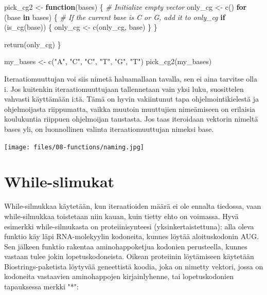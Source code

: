 \documentclass[
]{book}
\newenvironment{Shaded}{\begin{snugshade}}{\end{snugshade}}
\newcommand{\CommentTok}[1]{\textcolor[rgb]{0.56,0.35,0.01}{\textit{#1}}}
\newcommand{\ControlFlowTok}[1]{\textcolor[rgb]{0.13,0.29,0.53}{\textbf{#1}}}
\newcommand{\FunctionTok}[1]{\textcolor[rgb]{0.00,0.00,0.00}{#1}}
\newcommand{\NormalTok}[1]{#1}
\newcommand{\OtherTok}[1]{\textcolor[rgb]{0.56,0.35,0.01}{#1}}
\newcommand{\StringTok}[1]{\textcolor[rgb]{0.31,0.60,0.02}{#1}}
\begin{document}
\begin{Shaded}
\begin{Highlighting}[]
\NormalTok{pick\_cg2 }\OtherTok{\textless{}{-}} \ControlFlowTok{function}\NormalTok{(bases) \{}
  \CommentTok{\# Initialize empty vector}
\NormalTok{  only\_cg }\OtherTok{\textless{}{-}} \FunctionTok{c}\NormalTok{()}
  \ControlFlowTok{for}\NormalTok{ (base }\ControlFlowTok{in}\NormalTok{ bases) \{}
    \CommentTok{\# If the current base is C or G, add it to only\_cg}
    \ControlFlowTok{if}\NormalTok{ (}\FunctionTok{is\_cg}\NormalTok{(base)) \{}
\NormalTok{      only\_cg }\OtherTok{\textless{}{-}} \FunctionTok{c}\NormalTok{(only\_cg, base)}
\NormalTok{    \}}
\NormalTok{  \}}
  
  \FunctionTok{return}\NormalTok{(only\_cg)}
\NormalTok{\}}

\NormalTok{my\_bases }\OtherTok{\textless{}{-}} \FunctionTok{c}\NormalTok{(}\StringTok{"A"}\NormalTok{, }\StringTok{"C"}\NormalTok{, }\StringTok{"C"}\NormalTok{, }\StringTok{"T"}\NormalTok{, }\StringTok{"G"}\NormalTok{, }\StringTok{"T"}\NormalTok{)}
\FunctionTok{pick\_cg2}\NormalTok{(my\_bases)}
\end{Highlighting}
\end{Shaded}

Iteraatiomuuttujan voi siis nimetä haluamallaan tavalla, sen ei aina tarvitse olla i. Jos kuitenkin iteraatiomuuttujaan tallennetaan vain yksi luku, suosittelen vahvasti käyttämään i:tä. Tämä on hyvin vakiintunut tapa ohjelmointikielestä ja ohjelmoijasta riippumatta, vaikka muutoin muuttujien nimeämiseen on erilaisia koulukuntia riippuen ohjelmoijan taustasta. Jos taas iteroidaan vektorin nimeltä bases yli, on luonnollinen valinta iteraatiomuuttujan nimeksi base.

\texttt{[image: files/08-functions/naming.jpg]}

\hypertarget{while-slimukat}{%
\section{While-slimukat}\label{while-slimukat}}

While-silmukkaa käytetään, kun iteraatioiden määrä ei ole ennalta tiedossa, vaan while-silmukkaa toistetaan niin kauan, kuin tietty ehto on voimassa. Hyvä esimerkki while-silmukasta on proteiinisynteesi (yksinkertaistettuna): alla oleva funktio käy läpi RNA-molekyylin kodoneita, kunnes löytää aloituskodonin AUG. Sen jälkeen funktio rakentaa aminohappoketjua kodonien perusteella, kunnes vastaan tulee jokin lopetuskodoneista. Oikean proteiinin löytämiseen käytetään Biostrings-paketista löytyvää geneettistä koodia, joka on nimetty vektori, jossa on kodoneita vastaavien aminohappojen kirjainlyhenne, tai lopetuskodonien tapauksessa merkki "*":
\end{document}
